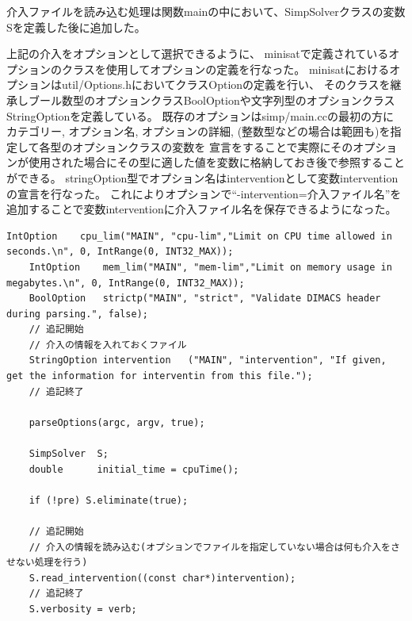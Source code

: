 介入ファイルを読み込む処理は関数mainの中において、SimpSolverクラスの変数Sを定義した後に追加した。

上記の介入をオプションとして選択できるように、
minisatで定義されているオプションのクラスを使用してオプションの定義を行なった。
minisatにおけるオプションはutil/Options.hにおいてクラスOptionの定義を行い、
そのクラスを継承しブール数型のオプションクラスBoolOptionや文字列型のオプションクラスStringOptionを定義している。
既存のオプションはsimp/main.ccの最初の方に
カテゴリー, オプション名, オプションの詳細, (整数型などの場合は範囲も)を指定して各型のオプションクラスの変数を
宣言をすることで実際にそのオプションが使用された場合にその型に適した値を変数に格納しておき後で参照することができる。
stringOption型でオプション名はinterventionとして変数interventionの宣言を行なった。
これによりオプションで``-intervention=介入ファイル名''を追加することで変数interventionに介入ファイル名を保存できるようになった。
\begin{lstlisting}[caption=介入ファイルの読み込みとオプションの選択をするための関数mainへの変更(core/Solver.cc), firstnumber=66]
    IntOption    cpu_lim("MAIN", "cpu-lim","Limit on CPU time allowed in seconds.\n", 0, IntRange(0, INT32_MAX));
    IntOption    mem_lim("MAIN", "mem-lim","Limit on memory usage in megabytes.\n", 0, IntRange(0, INT32_MAX));
    BoolOption   strictp("MAIN", "strict", "Validate DIMACS header during parsing.", false);
	// 追記開始
	// 介入の情報を入れておくファイル
    StringOption intervention   ("MAIN", "intervention", "If given, get the information for interventin from this file.");
	// 追記終了

    parseOptions(argc, argv, true);
        
    SimpSolver  S;
    double      initial_time = cpuTime();

    if (!pre) S.eliminate(true);

	// 追記開始
	// 介入の情報を読み込む(オプションでファイルを指定していない場合は何も介入をさせない処理を行う)
    S.read_intervention((const char*)intervention);
	// 追記終了
    S.verbosity = verb;
\end{lstlisting}

